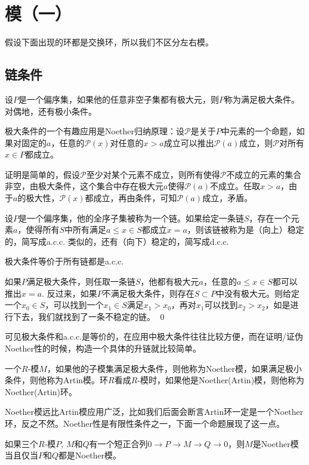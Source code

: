 \renewcommand\chapterimg{../Pictures/7.png}
\chapter{模（一）}
假设下面出现的环都是交换环，所以我们不区分左右模。

\section{链条件}

\para 设$P$是一个偏序集，如果他的任意非空子集都有极大元，则$P$称为满足极大条件。对偶地，还有极小条件。

极大条件的一个有趣应用是Noether归纳原理：设$\mathcal{P}$是关于$P$中元素的一个命题，如果对固定的$a$，任意的$\mathcal{P}(x)$对任意的$x>a$成立可以推出$\mathcal{P}(a)$成立，则$\mathcal{P}$对所有$x\in P$都成立。

证明是简单的，假设$\mathcal{P}$至少对某个元素不成立，则所有使得$\mathcal{P}$不成立的元素的集合非空，由极大条件，这个集合中存在极大元$a$使得$\mathcal{P}(a)$不成立。任取$x>a$，由于$a$的极大性，$\mathcal{P}(x)$都成立，再由条件，可知$\mathcal{P}(a)$成立，矛盾。

\para 设$P$是一个偏序集，他的全序子集被称为一个链。如果给定一条链$S$，存在一个元素$a$，使得所有$S$中所有满足$a\leq x\in S$都成立$x=a$，则该链被称为是（向上）稳定的，简写成a.c.c. 类似的，还有（向下）稳定的，简写成d.c.c.

\pro 极大条件等价于所有链都是a.c.c.

\proof
	如果$P$满足极大条件，则任取一条链$S$，他都有极大元$a$，任意的$a\leq x\in S$都可以推出$x=a$. 反过来，如果$P$不满足极大条件，则存在$S\subset P$中没有极大元。则给定一个$x_0\in S$，可以找到一个$x_1\in S$满足$x_1>x_0$，再对$x_1$可以找到$x_2>x_2$，如是进行下去，我们就找到了一条不稳定的链。
\qed

可见极大条件和a.c.c.是等价的，在应用中极大条件往往比较方便，而在证明/证伪Noether性的时候，构造一个具体的升链就比较简单。

\para 一个$R$-模$M$，如果他的子模集满足极大条件，则他称为Noether模，如果满足极小条件，则他称为Artin模。环$R$看成$R$-模时，如果他是Noether(Artin)模，则他称为Noether(Artin)环。

Noether模远比Artin模应用广泛，比如我们后面会断言Artin环一定是一个Noether环，反之不然。Noether性是有限性条件之一，下面一个命题展现了这一点。

\pro 如果三个$R$-模$P$, $M$和$Q$有一个短正合列$0\to P\to M\to Q\to 0$，则$M$是Noether模当且仅当$P$和$Q$都是Noether模。\notprove

